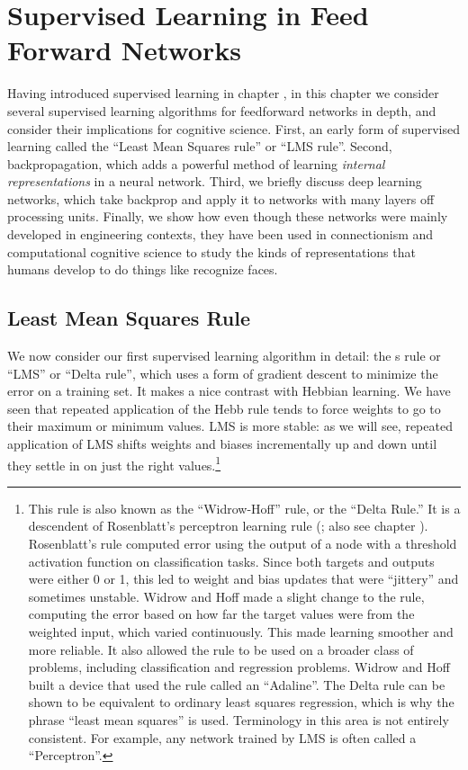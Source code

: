 \chapter{Supervised Learning in Feed Forward Networks}\label{ch_supervised_ff}
	
Having introduced supervised learning in chapter , in this chapter we consider several supervised learning algorithms for feedforward networks in depth, and consider their implications for cognitive science. First, an early form of supervised learning called the ``Least Mean Squares rule'' or ``LMS rule''. Second, backpropagation, which adds a powerful method of learning \emph{internal representations} in a neural network. Third, we briefly discuss deep learning networks, which take backprop and apply it to networks with many layers off processing units. Finally, we show how even though these networks were mainly developed in engineering contexts, they have been used in connectionism  and computational cognitive science  to study the  kinds of representations that humans develop to do things like recognize faces.

\section{Least Mean Squares Rule}\label{lms_rule}

We now consider our first supervised learning algorithm in detail: the s rule or ``LMS'' or ``Delta rule'', which uses a form of gradient descent to minimize the error on a training set. It makes a nice contrast with Hebbian learning. We have seen that repeated application of the Hebb rule tends to force weights to go to their maximum or minimum values. LMS is more stable: as we will see, repeated application of LMS shifts weights and biases incrementally up and down until they settle in on just the right values.\footnote{This rule is also known as the ``Widrow-Hoff'' rule, or the ``Delta Rule.'' It is a descendent of Rosenblatt's perceptron learning rule (\cite{rosenblatt1960perceptron}; also see chapter ). Rosenblatt's rule computed error using the output of a node with a threshold activation function on classification tasks. Since both targets and outputs were either 0 or 1, this led to weight and bias updates that were ``jittery'' and sometimes unstable. Widrow and Hoff made a slight change to the rule, computing the error based on how far the target values were from the weighted input, which varied continuously. This made learning smoother and more reliable. It also allowed the rule to be used on a broader class of problems, including classification and regression problems. Widrow and Hoff built a device that used the rule called an ``Adaline''. The Delta rule can be shown to be equivalent to ordinary least squares regression, which is why the phrase ``least mean squares'' is used. Terminology  in this  area is not entirely consistent. For example, any network trained by LMS is often called a ``Perceptron''. }  

